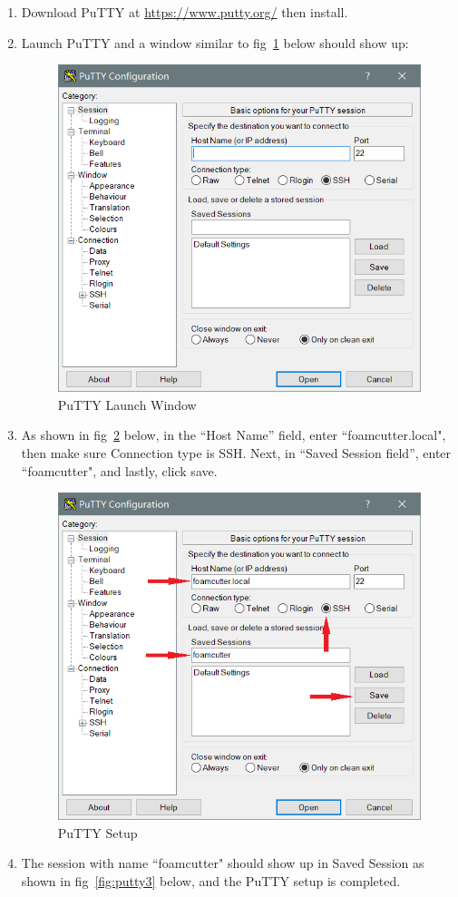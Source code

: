 \documentclass[titlepage,12pt,letter]{report}
\numberwithin{equation}{chapter}
\begin{document}
\begin{enumerate}[noitemsep,topsep=0pt]
	\item Download PuTTY at \href{https://www.putty.org/}{https://www.putty.org/} then install.
	\item Launch PuTTY and a window similar to fig~\ref{fig:putty1} below should show up:
	\begin{figure} [H]
		\includegraphics[width = 0.6\linewidth]{./Figures/Laptop_Setup/putty1.png}
		\caption{PuTTY Launch Window}
		\label{fig:putty1}
	\end{figure}
	\item As shown in fig~\ref{fig:putty2} below, in the ``Host Name'' field, enter ``foamcutter.local", then make sure Connection type is SSH. Next, in ``Saved Session field'', enter ``foamcutter", and lastly, click save.
	\begin{figure} [H]
		\includegraphics[width = 0.6\linewidth]{./Figures/Laptop_Setup/putty2.png}
		\caption{PuTTY Setup}
		\label{fig:putty2}
	\end{figure}
	\item The session with name ``foamcutter" should show up in Saved Session as shown in fig~\ref{fig:putty3} below, and the PuTTY setup is completed.

\end{enumerate}
\end{document}
